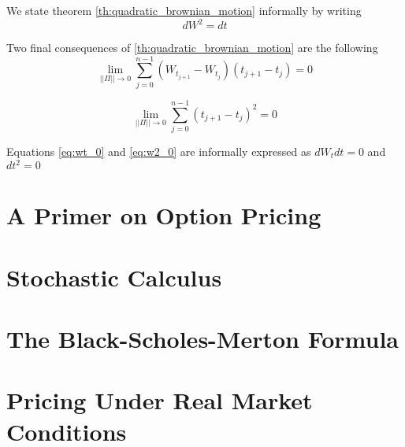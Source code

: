 \documentclass[11pt]{report}
\begin{document}
We state theorem \ref{th:quadratic_brownian_motion} informally by writing
\begin{equation}
	dW^2 = dt
\end{equation}

Two final consequences of \ref{th:quadratic_brownian_motion} are the following
\begin{equation}\label{eq:wt_0}
	\lim_{||\Pi||\to 0} \sum_{j=0}^{n-1}(W_{t_{j+1}} - W_{t_{j}})(t_{j+1} - t_{j}) = 0
\end{equation}

\begin{equation}\label{eq:w2_0}
	\lim_{||\Pi||\to 0} \sum_{j=0}^{n-1}(t_{j+1} - t_{j})^2 = 0
\end{equation}

Equations \ref{eq:wt_0} and \ref{eq:w2_0} are informally expressed as $dW_tdt = 0$ and $dt^2 = 0$

\chapter{A Primer on Option Pricing}
\chapter{Stochastic Calculus}
\chapter{The Black-Scholes-Merton Formula}
\chapter{Pricing Under Real Market Conditions}
\end{document}
